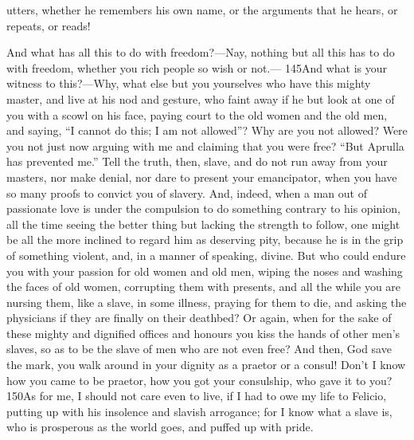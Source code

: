 utters, whether he remembers his own name, or the arguments that he hears, or repeats, or reads!

And what has all this to do with freedom?—Nay, nothing but all this has to do with freedom, whether you rich people so wish or not.— 145And what is your witness to this?—Why, what else but you yourselves who have this mighty master, and live at his nod and gesture, who faint away if he but look at one of you with a scowl on his face, paying court to the old women and the old men, and saying, ``I cannot do this; I am not allowed''? Why are you not allowed? Were you not just now arguing with me and claiming that you were free? ``But Aprulla has prevented me.'' Tell the truth, then, slave, and do not run away from your masters, nor make denial, nor dare to present your emancipator, when you have so many proofs to convict you of slavery. And, indeed, when a man out of passionate love is under the compulsion to do something contrary to his opinion, all the time seeing the better thing but lacking the strength to follow, one might be all the more inclined to regard him as deserving pity, because he is in the grip of something violent, and, in a manner of speaking, divine. But who could endure you with your passion for old women and old men, wiping the noses and washing the faces of old women, corrupting them with presents, and all the while you are nursing them, like a slave, in some illness, praying for them to die, and asking the physicians if they are finally on their deathbed? Or again, when for the sake of these mighty and dignified offices and honours you kiss the hands of other men's slaves, so as to be the slave of men who are not even free? And then, God save the mark, you walk around in your dignity as a praetor or a consul! Don't I know how you came to be praetor, how you got your consulship, who gave it to you? 150As for me, I should not care even to live, if I had to owe my life to Felicio, putting up with his insolence and slavish arrogance; for I know what a slave is, who is prosperous as the world goes, and puffed up with pride.

